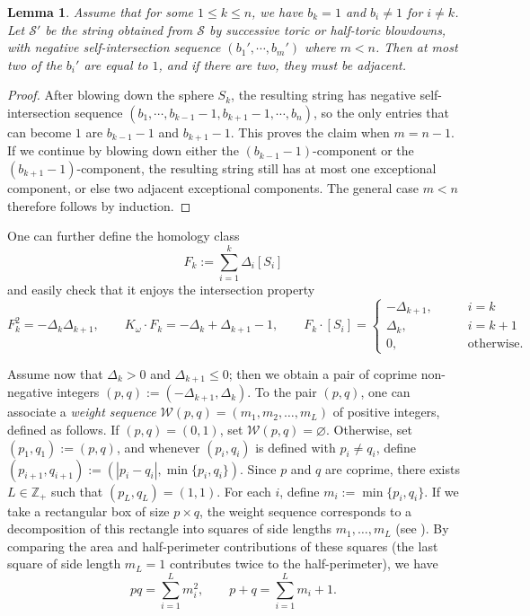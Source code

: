 \documentclass[11pt]{article}
\newtheorem{lemma}[theorem]{Lemma}
\theoremstyle{definition}
\theoremstyle{remark}
\newcommand{\st}{\mathcal{S}}
\begin{document}
\begin{lemma}\label{lem:adjacent-1}
  Assume that for some $1\leq k\leq n$, we have $b_k=1$ and $b_i\neq 1$ for $i\neq k$. Let $\st'$ be the string obtained from $\st$ by successive toric or half-toric blowdowns, with negative self-intersection sequence $(b_1',\cdots,b_m')$ where $m<n$. Then at most two of the $b_i'$ are equal to $1$, and if there are two, they must be adjacent.
\end{lemma}

\begin{proof}
  After blowing down the sphere $S_k$, the resulting string has negative self-intersection sequence $(b_1,\cdots,b_{k-1}-1,b_{k+1}-1,\cdots,b_n)$, so the only entries that can become $1$ are $b_{k-1}-1$ and $b_{k+1}-1$. This proves the claim when $m=n-1$. If we continue by blowing down either the $(b_{k-1}-1)$-component or the $(b_{k+1}-1)$-component, the resulting string still has at most one exceptional component, or else two adjacent exceptional components. The general case $m<n$ therefore follows by induction.
\end{proof}

 One can further define the homology class 
\[F_k:=\sum_{i=1}^k\Delta_i[S_i]\]
and easily check that it enjoys the intersection property 
\[F_k^2=-\Delta_k\Delta_{k+1},\qquad K_\omega\cdot F_k=-\Delta_k+\Delta_{k+1}-1,\qquad F_k\cdot [S_i]=\begin{cases}
  -\Delta_{k+1},\qquad & i=k\\
  \Delta_k,\qquad & i=k+1\\
  0,\qquad & \text{otherwise.}
\end{cases}\]

Assume now that $\Delta_k>0$ and $\Delta_{k+1}\leq 0$; then we obtain a pair of coprime non-negative integers
\(
(p,q):=(-\Delta_{k+1},\Delta_k).
\) To the pair $(p,q)$, one can associate a \emph{weight sequence} $\mathcal{W}(p,q)=(m_1,m_2,\ldots,m_L)$ of positive integers, defined as follows. If $(p,q)=(0,1)$, set $\mathcal{W}(p,q)=\varnothing$. Otherwise, set $(p_1,q_1):=(p,q)$, and whenever $(p_i,q_i)$ is defined with $p_i\neq q_i$, define
$(p_{i+1},q_{i+1}):=(|p_i-q_i|,\min\{p_i,q_i\})$. Since $p$ and $q$ are coprime, there exists $L\in\mathbb{Z}_{+}$ such that $(p_L,q_L)=(1,1)$. For each $i$, define
$m_i:=\min\{p_i,q_i\}$. If we take a rectangular box of size $p\times q$, the weight sequence corresponds to a decomposition of this rectangle into squares of side lengths $m_1,\dots,m_L$ (see \cite[Section 4.1]{McduffSiegel}). By comparing the area and half-perimeter contributions of these squares (the last square of side length $m_L=1$ contributes twice to the half-perimeter), we have
\[pq=\sum_{i=1}^L m_i^2,\qquad p+q=\sum_{i=1}^L m_i+1.\]
\end{document}
